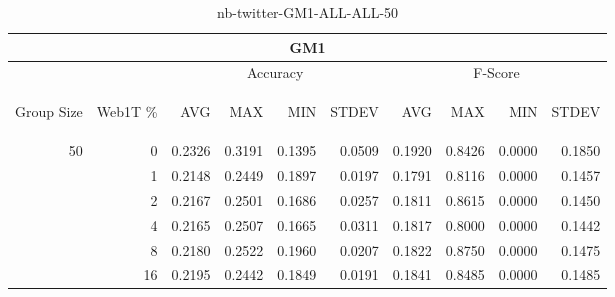 \begin{center}
\begin{table}[htbp]
\begin{center}
\begin{tabular}{ | r | r | r | r | r | r | r | r | r | r |}
\hline
\multicolumn{10}{|c|}{GM1}\\
\hline
 & & \multicolumn{4}{|c|}{Accuracy} & \multicolumn{4}{|c|}{F-Score}\\ \cline{3-10}
\begin{sideways}Group Size\end{sideways} & \begin{sideways}Web1T \%\end{sideways} & \begin{sideways}AVG\end{sideways} & \begin{sideways}MAX\end{sideways} & \begin{sideways}MIN\end{sideways} & \begin{sideways}STDEV\end{sideways} & \begin{sideways}AVG\end{sideways} & \begin{sideways}MAX\end{sideways} & \begin{sideways}MIN\end{sideways} & \begin{sideways}STDEV\end{sideways}\\
\hline
\multirow{5}{*}{50}
 & 0 & 0.2326 & 0.3191 & 0.1395 & 0.0509 & 0.1920 & 0.8426 & 0.0000 & 0.1850\\ \cline{2-10}
 & 1 & 0.2148 & 0.2449 & 0.1897 & 0.0197 & 0.1791 & 0.8116 & 0.0000 & 0.1457\\ \cline{2-10}
 & 2 & 0.2167 & 0.2501 & 0.1686 & 0.0257 & 0.1811 & 0.8615 & 0.0000 & 0.1450\\ \cline{2-10}
 & 4 & 0.2165 & 0.2507 & 0.1665 & 0.0311 & 0.1817 & 0.8000 & 0.0000 & 0.1442\\ \cline{2-10}
 & 8 & 0.2180 & 0.2522 & 0.1960 & 0.0207 & 0.1822 & 0.8750 & 0.0000 & 0.1475\\ \cline{2-10}
 & 16 & 0.2195 & 0.2442 & 0.1849 & 0.0191 & 0.1841 & 0.8485 & 0.0000 & 0.1485\\ \cline{2-10}
\hline
\end{tabular}
\caption{nb-twitter-GM1-ALL-ALL-50}
\label{table:nb-twitter-GM1-ALL-ALL-50}
\end{center}
\end{table}
\end{center}


